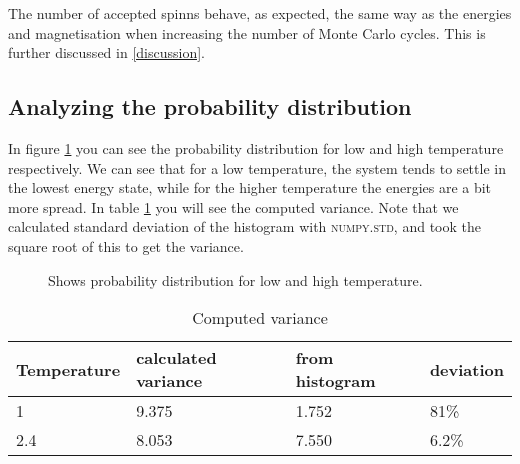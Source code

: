 \documentclass[../main.tex]{subfiles}
\begin{document}
The number of accepted spinns behave, as expected, the same way as the energies and magnetisation when increasing the number of Monte Carlo cycles. This is further discussed in \ref{discussion}. 

\subsection{Analyzing the probability distribution}
In figure \ref{fig:results-ProbE_T24} you can see the probability distribution for low and high temperature respectively. We can see that for a low temperature, the system tends to settle in the lowest energy state, while for the higher temperature the energies are a bit more spread. In table \ref{tab:results-variance} you will see the computed variance. Note that we calculated standard deviation of the histogram with \textsc{numpy.std}, and took the square root of this to get the variance.

\begin{figure}[!h]
  \centering
  \caption{Shows probability distribution for low and high temperature.}
  \label{fig:results-ProbE_T24}
\end{figure}
\FloatBarrier


\begin{table}[!h]
  \begin{center}
    \begin{tabular}{|l| l| l| l|}
      \hline
      Temperature & calculated variance & from histogram & deviation\\
      \hline
      1 & 9.375 & 1.752 & 81\%\\
      2.4 & 8.053  & 7.550 & 6.2\%\\
      \hline
    \end{tabular}
    \caption{Computed variance}
    \label{tab:results-variance}
  \end{center}
\end{table}
\FloatBarrier

\end{document}
